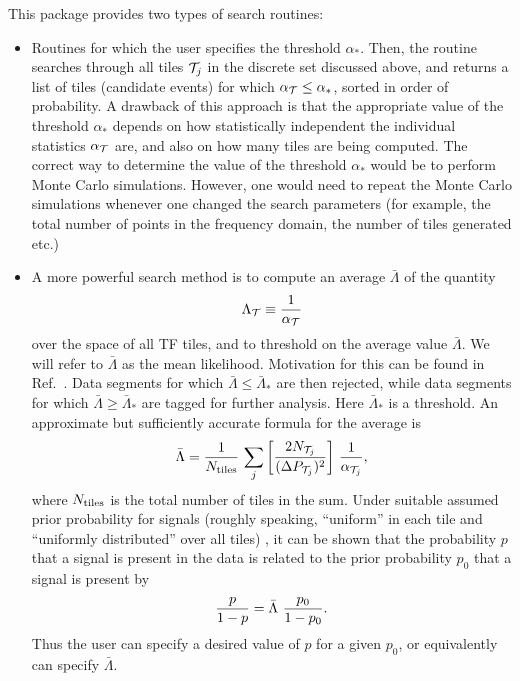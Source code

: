 This package provides two types of search routines:
\begin{itemize}
\item Routines for which the user specifies the threshold $\alpha_*$.
Then, the routine searches through all tiles ${\cal T}_j$ in the
discrete set discussed above, and returns a list of tiles (candidate
events) for which $\alpha_{\cal T} \le \alpha_*$, sorted in order of
probability.  A drawback of this
approach is that the appropriate value of the threshold $\alpha_*$
depends on how 
statistically independent the individual statistics $\alpha_{\cal T}$
are, and also on how many tiles are being computed.  The correct way
to determine the value of the threshold $\alpha_*$ would be to perform
Monte Carlo simulations.  However, one would need to repeat the Monte
Carlo simulations whenever one changed the search parameters (for
example, the total number of points in the frequency domain, the
number of tiles generated etc.)

\item A more powerful search method is to compute an average ${\bar
\Lambda}$ of the quantity 
\begin{equation}
\Lambda_{\cal T} \equiv {1 \over \alpha_{\cal T}}
\end{equation}
over the space of all TF tiles, and to threshold on the average value
${\bar \Lambda}$.  We will refer to ${\bar \Lambda}$ as the mean likelihood.
Motivation for this can be found in Ref.\ \cite{abcf:2000}.
Data segments for which ${\bar \Lambda} \le {\bar
\Lambda}_*$ are then rejected, while data segments for which
${\bar \Lambda} \ge {\bar \Lambda}_*$ are tagged for further
analysis.  Here ${\bar \Lambda}_*$ is a threshold.  An approximate but
sufficiently accurate formula for the average is \cite{abcf:2000}
\begin{equation}
{\bar \Lambda} = {1 \over N_{\rm tiles}} \, \sum_j \left[{2 N_{{\cal
T}_j} \over (\Delta P_{{\cal T}_j})^2 } \right] \, {1 \over
\alpha_{{\cal T}_j}},
\label{meanlikelihood}
\end{equation}
where $N_{\rm tiles}$ is the total number of tiles in the sum.  Under
suitable assumed prior probability for signals (roughly speaking,
``uniform'' in each tile and ``uniformly distributed'' over all tiles)  
, it can be shown that the probability $p$ that a signal is present in
the data is related to the prior probability $p_0$ that a signal is
present by \cite{abcf:2000}
\begin{equation}
{p \over 1 - p} = {\bar \Lambda} \ {p_0 \over 1 - p_0}.
\label{ff1}
\end{equation}
Thus the user can specify a desired value of $p$ for a given $p_0$, or
equivalently can specify ${\bar \Lambda}$.  

\end{itemize}

